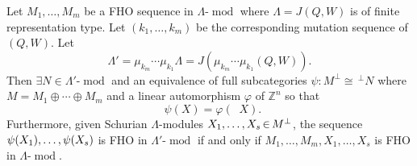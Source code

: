 \documentclass[ALCO,ThmDefs,Unicode,epreuves]{cedram}
\DeclareMathOperator{\undim}{\underline{dim}}
\DeclareMathOperator{\modr}{mod}
\newcommand{\field}[1]{\mathbb{#1}}
\newcommand{\ZZ}{\ensuremath{{\field{Z}}}}
\newcommand*{\Mk}{\mkern -2mu}
\begin{document}
\begin{prop}\label{prop: iterated mutation}
Let $M_1,\ldots,M_m$ be a FHO sequence in $\Lambda\text{-}\modr $ where $\Lambda=J(Q,W)$ is of finite representation type. Let $(k_1,\ldots,k_m)$ be the corresponding mutation sequence of $(Q,W)$. Let
\[
	\Lambda'=\mu_{k_m}\cdots\mu_{k_1}\Lambda=J(\mu_{k_m}\cdots\mu_{k_1}(Q,W)).
\]
Then $\exists N\in\Lambda'\text{-}\modr $ and an equivalence of full subcategories $\psi:M^\perp\cong \,^{\perp}N$ where $M=M_1\oplus\cdots\oplus M_m$ and a linear automorphism $\varphi$ of $\ZZ^n$ so that
\[
	\undim \psi(X)=\varphi(\undim X).
\]
Furthermore, given Schurian $\Lambda$-modules $X_1,\ldots,X_s\Mk \in\Mk  M^\perp$, the sequence $\psi(X_1),\ldots,\break\psi(X_s)$ is FHO in $\Lambda'$-$\modr$ if and only if $M_1,\ldots,M_m,X_1,\ldots,X_s$ is FHO in $\Lambda\text{-}\modr $.
\end{prop}
\end{document}
